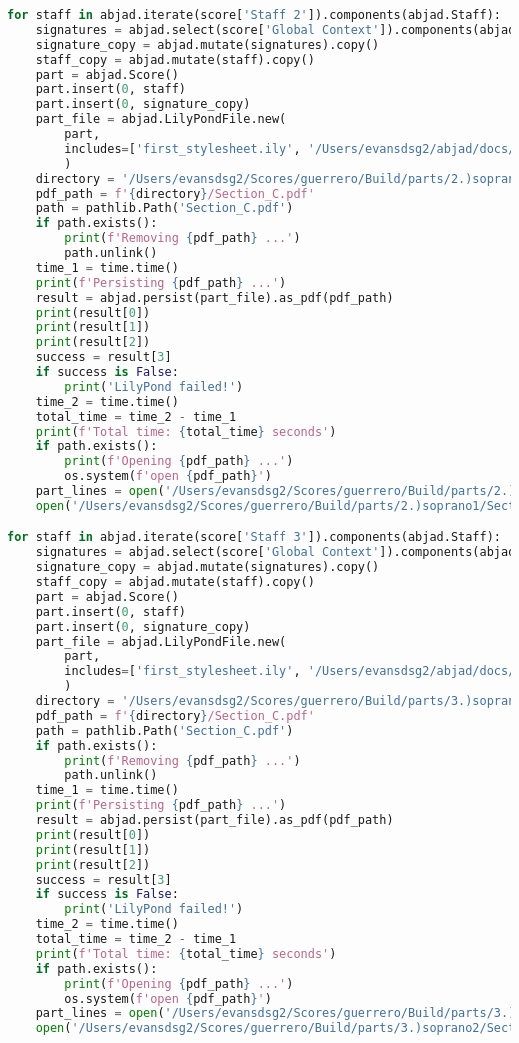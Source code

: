 \begin{lstlisting}[language=Python, caption=Invocation Source Code]
for staff in abjad.iterate(score['Staff 2']).components(abjad.Staff):
    signatures = abjad.select(score['Global Context']).components(abjad.Staff)
    signature_copy = abjad.mutate(signatures).copy()
    staff_copy = abjad.mutate(staff).copy()
    part = abjad.Score()
    part.insert(0, staff)
    part.insert(0, signature_copy)
    part_file = abjad.LilyPondFile.new(
        part,
        includes=['first_stylesheet.ily', '/Users/evansdsg2/abjad/docs/source/_stylesheets/abjad.ily'],
        )
    directory = '/Users/evansdsg2/Scores/guerrero/Build/parts/2.)soprano1'
    pdf_path = f'{directory}/Section_C.pdf'
    path = pathlib.Path('Section_C.pdf')
    if path.exists():
        print(f'Removing {pdf_path} ...')
        path.unlink()
    time_1 = time.time()
    print(f'Persisting {pdf_path} ...')
    result = abjad.persist(part_file).as_pdf(pdf_path)
    print(result[0])
    print(result[1])
    print(result[2])
    success = result[3]
    if success is False:
        print('LilyPond failed!')
    time_2 = time.time()
    total_time = time_2 - time_1
    print(f'Total time: {total_time} seconds')
    if path.exists():
        print(f'Opening {pdf_path} ...')
        os.system(f'open {pdf_path}')
    part_lines = open('/Users/evansdsg2/Scores/guerrero/Build/parts/2.)soprano1/Section_C.ly').readlines()
    open('/Users/evansdsg2/Scores/guerrero/Build/parts/2.)soprano1/Section_C.ly', 'w').writelines(part_lines[15:-1])

for staff in abjad.iterate(score['Staff 3']).components(abjad.Staff):
    signatures = abjad.select(score['Global Context']).components(abjad.Staff)
    signature_copy = abjad.mutate(signatures).copy()
    staff_copy = abjad.mutate(staff).copy()
    part = abjad.Score()
    part.insert(0, staff)
    part.insert(0, signature_copy)
    part_file = abjad.LilyPondFile.new(
        part,
        includes=['first_stylesheet.ily', '/Users/evansdsg2/abjad/docs/source/_stylesheets/abjad.ily'],
        )
    directory = '/Users/evansdsg2/Scores/guerrero/Build/parts/3.)soprano2'
    pdf_path = f'{directory}/Section_C.pdf'
    path = pathlib.Path('Section_C.pdf')
    if path.exists():
        print(f'Removing {pdf_path} ...')
        path.unlink()
    time_1 = time.time()
    print(f'Persisting {pdf_path} ...')
    result = abjad.persist(part_file).as_pdf(pdf_path)
    print(result[0])
    print(result[1])
    print(result[2])
    success = result[3]
    if success is False:
        print('LilyPond failed!')
    time_2 = time.time()
    total_time = time_2 - time_1
    print(f'Total time: {total_time} seconds')
    if path.exists():
        print(f'Opening {pdf_path} ...')
        os.system(f'open {pdf_path}')
    part_lines = open('/Users/evansdsg2/Scores/guerrero/Build/parts/3.)soprano2/Section_C.ly').readlines()
    open('/Users/evansdsg2/Scores/guerrero/Build/parts/3.)soprano2/Section_C.ly', 'w').writelines(part_lines[15:-1])


\end{lstlisting}
